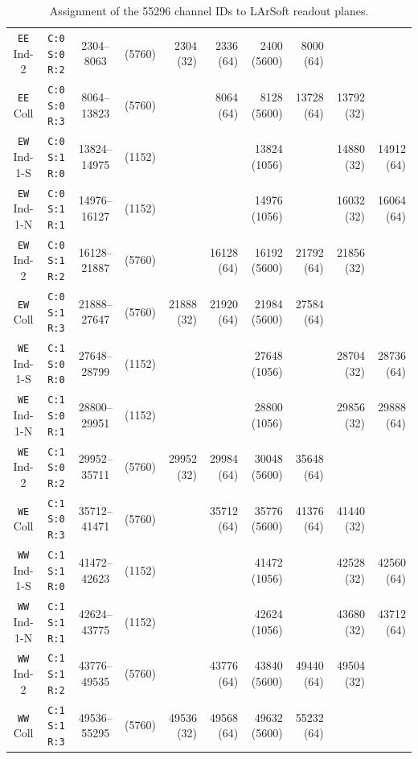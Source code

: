 \begin{table}
\begin{tabular}{|cc|cc|rrrrrr|}
    \texttt{EE} Ind-2   & \texttt{C:0 S:0 R:2} &  2304--8063  & (5760) &  2304 (32) &  2336 (64) &  2400 (5600) &  8000 (64) &            &            \\
    \texttt{EE} Coll    & \texttt{C:0 S:0 R:3} &  8064--13823 & (5760) &            &  8064 (64) &  8128 (5600) & 13728 (64) & 13792 (32) &            \\
    \hline
    \texttt{EW} Ind-1-S & \texttt{C:0 S:1 R:0} & 13824--14975 & (1152) &            &            & 13824 (1056) &            & 14880 (32) & 14912 (64) \\
    \texttt{EW} Ind-1-N & \texttt{C:0 S:1 R:1} & 14976--16127 & (1152) &            &            & 14976 (1056) &            & 16032 (32) & 16064 (64) \\
    \texttt{EW} Ind-2   & \texttt{C:0 S:1 R:2} & 16128--21887 & (5760) &            & 16128 (64) & 16192 (5600) & 21792 (64) & 21856 (32) &            \\
    \texttt{EW} Coll    & \texttt{C:0 S:1 R:3} & 21888--27647 & (5760) & 21888 (32) & 21920 (64) & 21984 (5600) & 27584 (64) &            &            \\
    \hline
    \hline
    \texttt{WE} Ind-1-S & \texttt{C:1 S:0 R:0} & 27648--28799 & (1152) &            &            & 27648 (1056) &            & 28704 (32) & 28736 (64) \\
    \texttt{WE} Ind-1-N & \texttt{C:1 S:0 R:1} & 28800--29951 & (1152) &            &            & 28800 (1056) &            & 29856 (32) & 29888 (64) \\
    \texttt{WE} Ind-2   & \texttt{C:1 S:0 R:2} & 29952--35711 & (5760) & 29952 (32) & 29984 (64) & 30048 (5600) & 35648 (64) &            &            \\
    \texttt{WE} Coll    & \texttt{C:1 S:0 R:3} & 35712--41471 & (5760) &            & 35712 (64) & 35776 (5600) & 41376 (64) & 41440 (32) &            \\
    \hline
    \texttt{WW} Ind-1-S & \texttt{C:1 S:1 R:0} & 41472--42623 & (1152) &            &            & 41472 (1056) &            & 42528 (32) & 42560 (64) \\
    \texttt{WW} Ind-1-N & \texttt{C:1 S:1 R:1} & 42624--43775 & (1152) &            &            & 42624 (1056) &            & 43680 (32) & 43712 (64) \\
    \texttt{WW} Ind-2   & \texttt{C:1 S:1 R:2} & 43776--49535 & (5760) &            & 43776 (64) & 43840 (5600) & 49440 (64) & 49504 (32) &            \\
    \texttt{WW} Coll    & \texttt{C:1 S:1 R:3} & 49536--55295 & (5760) & 49536 (32) & 49568 (64) & 49632 (5600) & 55232 (64) &            &            \\
    \hline
    \hline
  \end{tabular}
  \caption{
    Assignment of the 55296 channel IDs to LArSoft readout planes.
    \label{table:LArSoftChannels}
  }
\end{table}

